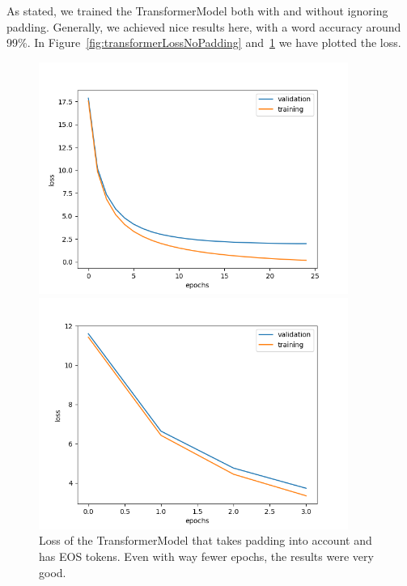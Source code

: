\documentclass{article}
\begin{document}
As stated, we trained the TransformerModel both with and without ignoring
padding. Generally, we achieved nice results here, with a word accuracy around
99\%. In Figure~\ref{fig:transformerLossNoPadding}
and~\ref{fig:transformerLossPaddingEOS} we have plotted the loss.

\begin{figure}[h]
    \centering
    \begin{minipage}{0.45\textwidth}
        \captionsetup{width=0.8\textwidth}
        \includegraphics[width=0.9\textwidth]{transformer.png}
        \caption{%
            Loss of the standard TransformerModel
        }\label{fig:transformerLossNoPadding}
    \end{minipage}
    \begin{minipage}{0.45\textwidth}
        \captionsetup{width=0.8\textwidth}
        \includegraphics[width=0.9\textwidth]{transformer_padding-eos.png}
        \caption{%
            Loss of the TransformerModel that takes padding into account and has
            EOS tokens. Even with way fewer epochs, the results were very good.
        }\label{fig:transformerLossPaddingEOS}
    \end{minipage}
\end{figure}
\end{document}
